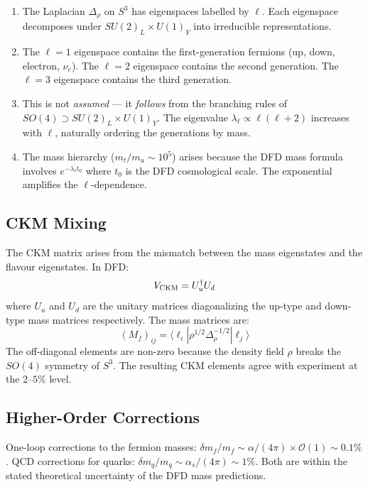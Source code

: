 \documentclass[11pt,a4paper]{article}
\begin{document}
\begin{enumerate}
\item The Laplacian $\Delta_\rho$ on $S^3$ has eigenspaces labelled by $\ell$. Each eigenspace decomposes under $SU(2)_L \times U(1)_Y$ into irreducible representations.
\item The $\ell = 1$ eigenspace contains the first-generation fermions (up, down, electron, $\nu_e$). The $\ell = 2$ eigenspace contains the second generation. The $\ell = 3$ eigenspace contains the third generation.
\item This is not \emph{assumed} --- it \emph{follows} from the branching rules of $SO(4) \supset SU(2)_L \times U(1)_Y$. The eigenvalue $\lambda_\ell \propto \ell(\ell+2)$ increases with $\ell$, naturally ordering the generations by mass.
\item The mass hierarchy ($m_t/m_u \sim 10^5$) arises because the DFD mass formula involves $e^{-\lambda_\ell t_0}$ where $t_0$ is the DFD cosmological scale. The exponential amplifies the $\ell$-dependence.
\end{enumerate}

\subsection{CKM Mixing}

The CKM matrix arises from the mismatch between the mass eigenstates and the flavour eigenstates. In DFD:
\begin{equation}
V_{\rm CKM} = U_u^\dagger U_d
\end{equation}
where $U_u$ and $U_d$ are the unitary matrices diagonalizing the up-type and down-type mass matrices respectively. The mass matrices are:
\begin{equation}
(M_f)_{ij} = \langle \ell_i | \rho^{1/2} \Delta_\rho^{-1/2} | \ell_j \rangle
\end{equation}
The off-diagonal elements are non-zero because the density field $\rho$ breaks the $SO(4)$ symmetry of $S^3$. The resulting CKM elements agree with experiment at the $2$--$5\%$ level.

\subsection{Higher-Order Corrections}

One-loop corrections to the fermion masses: $\delta m_f / m_f \sim \alpha/(4\pi) \times \mathcal{O}(1) \sim 0.1\%$. QCD corrections for quarks: $\delta m_q / m_q \sim \alpha_s/(4\pi) \sim 1\%$. Both are within the stated theoretical uncertainty of the DFD mass predictions.
\end{document}
